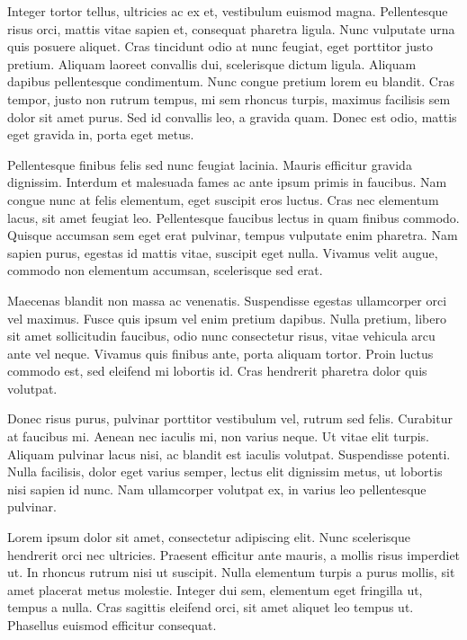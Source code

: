 Integer tortor tellus, ultricies ac ex et, vestibulum euismod magna. Pellentesque risus orci, mattis vitae sapien et, consequat pharetra ligula. Nunc vulputate urna quis posuere aliquet. Cras tincidunt odio at nunc feugiat, eget porttitor justo pretium. Aliquam laoreet convallis dui, scelerisque dictum ligula. Aliquam dapibus pellentesque condimentum. Nunc congue pretium lorem eu blandit. Cras tempor, justo non rutrum tempus, mi sem rhoncus turpis, maximus facilisis sem dolor sit amet purus. Sed id convallis leo, a gravida quam. Donec est odio, mattis eget gravida in, porta eget metus.

Pellentesque finibus felis sed nunc feugiat lacinia. Mauris efficitur gravida dignissim. Interdum et malesuada fames ac ante ipsum primis in faucibus. Nam congue nunc at felis elementum, eget suscipit eros luctus. Cras nec elementum lacus, sit amet feugiat leo. Pellentesque faucibus lectus in quam finibus commodo. Quisque accumsan sem eget erat pulvinar, tempus vulputate enim pharetra. Nam sapien purus, egestas id mattis vitae, suscipit eget nulla. Vivamus velit augue, commodo non elementum accumsan, scelerisque sed erat.

Maecenas blandit non massa ac venenatis. Suspendisse egestas ullamcorper orci vel maximus. Fusce quis ipsum vel enim pretium dapibus. Nulla pretium, libero sit amet sollicitudin faucibus, odio nunc consectetur risus, vitae vehicula arcu ante vel neque. Vivamus quis finibus ante, porta aliquam tortor. Proin luctus commodo est, sed eleifend mi lobortis id. Cras hendrerit pharetra dolor quis volutpat.

Donec risus purus, pulvinar porttitor vestibulum vel, rutrum sed felis. Curabitur at faucibus mi. Aenean nec iaculis mi, non varius neque. Ut vitae elit turpis. Aliquam pulvinar lacus nisi, ac blandit est iaculis volutpat. Suspendisse potenti. Nulla facilisis, dolor eget varius semper, lectus elit dignissim metus, ut lobortis nisi sapien id nunc. Nam ullamcorper volutpat ex, in varius leo pellentesque pulvinar.

Lorem ipsum dolor sit amet, consectetur adipiscing elit. Nunc scelerisque hendrerit orci nec ultricies. Praesent efficitur ante mauris, a mollis risus imperdiet ut. In rhoncus rutrum nisi ut suscipit. Nulla elementum turpis a purus mollis, sit amet placerat metus molestie. Integer dui sem, elementum eget fringilla ut, tempus a nulla. Cras sagittis eleifend orci, sit amet aliquet leo tempus ut. Phasellus euismod efficitur consequat.

